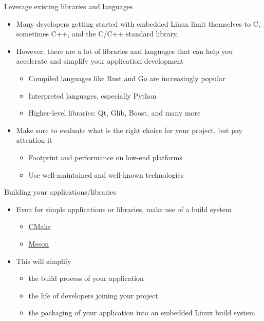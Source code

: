 \begin{frame}{Leverage existing libraries and languages}
  \begin{itemize}
  \item Many developers getting started with embedded Linux limit
    themselves to C, sometimes C++, and the C/C++ standard library.
  \item However, there are a lot of libraries and languages that can
    help you accelerate and simplify your application development
    \begin{itemize}
    \item Compiled languages like Rust and Go are increasingly popular
    \item Interpreted languages, especially Python
    \item Higher-level libraries: Qt, Glib, Boost, and many more
    \end{itemize}
  \item Make sure to evaluate what is the right choice for your
    project, but pay attention it
    \begin{itemize}
    \item Footprint and performance on low-end platforms
    \item Use well-maintained and well-known technologies
    \end{itemize}
  \end{itemize}
\end{frame}

\begin{frame}{Building your applications/libraries}
  \begin{itemize}
  \item Even for simple applications or libraries, make use of a build
    system
    \begin{itemize}
    \item \href{https://cmake.org/}{CMake}
    \item \href{https://mesonbuild.com/}{Meson}
    \end{itemize}
  \item This will simplify
    \begin{itemize}
    \item the build process of your application
    \item the life of developers joining your project
    \item the packaging of your application into an embedded Linux
      build system
    \end{itemize}
  \end{itemize}
\end{frame}

